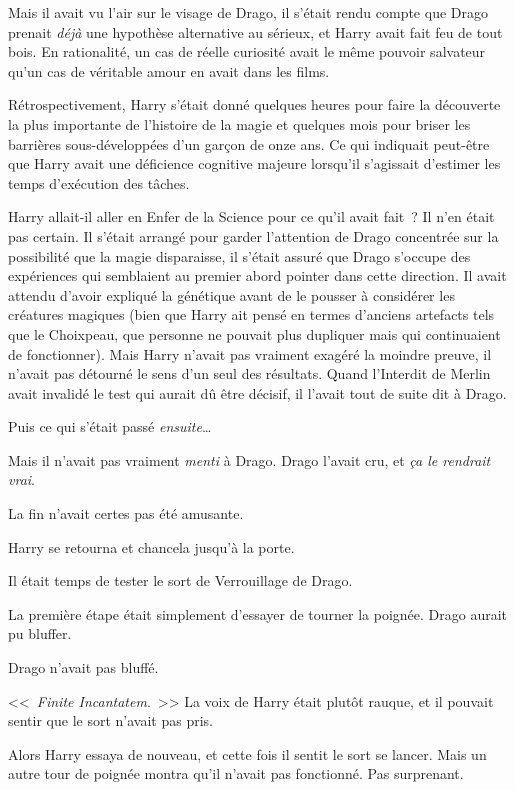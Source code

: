 Mais il avait vu l'air sur le visage de Drago, il s'était rendu compte que Drago prenait \emph{déjà} une hypothèse alternative au sérieux, et Harry avait fait feu de tout bois. En rationalité, un cas de réelle curiosité avait le même pouvoir salvateur qu'un cas de véritable amour en avait dans les films.

Rétrospectivement, Harry s'était donné quelques heures pour faire la découverte la plus importante de l'histoire de la magie et quelques mois pour briser les barrières sous-développées d'un garçon de onze ans. Ce qui indiquait peut-être que Harry avait une déficience cognitive majeure lorsqu'il s'agissait d'estimer les temps d'exécution des tâches.

Harry allait-il aller en Enfer de la Science pour ce qu'il avait fait~? Il n'en était pas certain. Il s'était arrangé pour garder l'attention de Drago concentrée sur la possibilité que la magie disparaisse, il s'était assuré que Drago s'occupe des expériences qui semblaient au premier abord pointer dans cette direction. Il avait attendu d'avoir expliqué la génétique avant de le pousser à considérer les créatures magiques (bien que Harry ait pensé en termes d'anciens artefacts tels que le Choixpeau, que personne ne pouvait plus dupliquer mais qui continuaient de fonctionner). Mais Harry n'avait pas vraiment exagéré la moindre preuve, il n'avait pas détourné le sens d'un seul des résultats. Quand l'Interdit de Merlin avait invalidé le test qui aurait dû être décisif, il l'avait tout de suite dit à Drago.

Puis ce qui s'était passé \emph{ensuite}…

Mais il n'avait pas vraiment \emph{menti} à Drago. Drago l'avait cru, et \emph{ça le rendrait vrai}.

La fin n'avait certes pas été amusante.

Harry se retourna et chancela jusqu'à la porte.

Il était temps de tester le sort de Verrouillage de Drago.

La première étape était simplement d'essayer de tourner la poignée. Drago aurait pu bluffer.

Drago n'avait pas bluffé.

<<~\emph{Finite Incantatem}.~>> La voix de Harry était plutôt rauque, et il pouvait sentir que le sort n'avait pas pris.

Alors Harry essaya de nouveau, et cette fois il sentit le sort se lancer. Mais un autre tour de poignée montra qu'il n'avait pas fonctionné. Pas surprenant.

